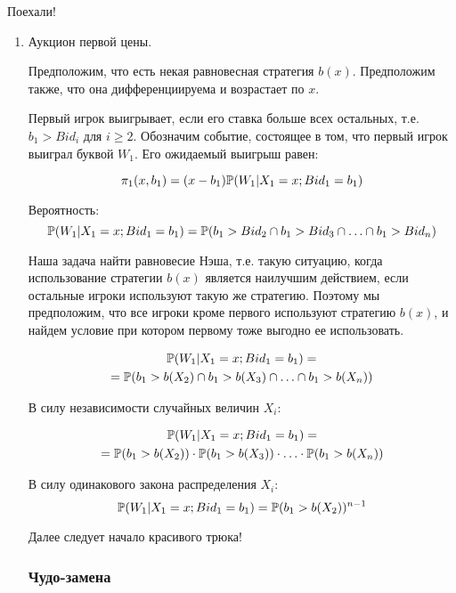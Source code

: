 Поехали!
\begin{enumerate}
\item Аукцион первой цены. 

Предположим, что есть некая равновесная стратегия $ b(x) $. Предположим также, что она дифференциируема и возрастает по $ x $. 

Первый игрок выигрывает, если его ставка больше всех остальных, т.е. $ b_{1}>Bid_{i} $ для $ i\geq 2 $. Обозначим событие, состоящее в том, что первый игрок выиграл буквой $ W_{1} $. Его ожидаемый выигрыш равен:


\begin{equation}
\label{first_price_eq}
\pi_{1}(x,b_{1})=(x-b_{1})\P(W_{1}|X_{1}=x; Bid_{1}=b_{1})
\end{equation}

Вероятность:
\begin{equation}
\P(W_{1}|X_{1}=x; Bid_{1}=b_{1})=\P(b_{1}>Bid_{2} \cap b_{1}>Bid_{3} \cap \ldots \cap b_{1}>Bid_{n})
\end{equation}


Наша задача найти равновесие Нэша, т.е. такую ситуацию, когда использование стратегии $ b(x) $ является наилучшим действием, если остальные игроки используют такую же стратегию. Поэтому мы предположим, что все игроки кроме первого используют стратегию $ b(x) $, и найдем условие при котором первому тоже выгодно ее использовать.

\begin{multline}
\P(W_{1}|X_{1}=x; Bid_{1}=b_{1})=\\
=\P(b_{1}>b(X_{2}) \cap b_{1}>b(X_{3}) \cap \ldots \cap b_{1}>b(X_{n}))
\end{multline}

В силу независимости случайных величин $ X_{i} $:

\begin{multline}
\P(W_{1}|X_{1}=x; Bid_{1}=b_{1})=\\
=\P(b_{1}>b(X_{2}))\cdot \P(b_{1}>b(X_{3}))\cdot \ldots\cdot \P(b_{1}>b(X_{n}))
\end{multline}

В силу одинакового закона распределения $ X_{i} $:
\begin{equation}
\P(W_{1}|X_{1}=x; Bid_{1}=b_{1})=\P(b_{1}>b(X_{2}))^{n-1}
\end{equation}



Далее следует начало красивого трюка! 

\subsubsection*{Чудо-замена}


\end{enumerate}
